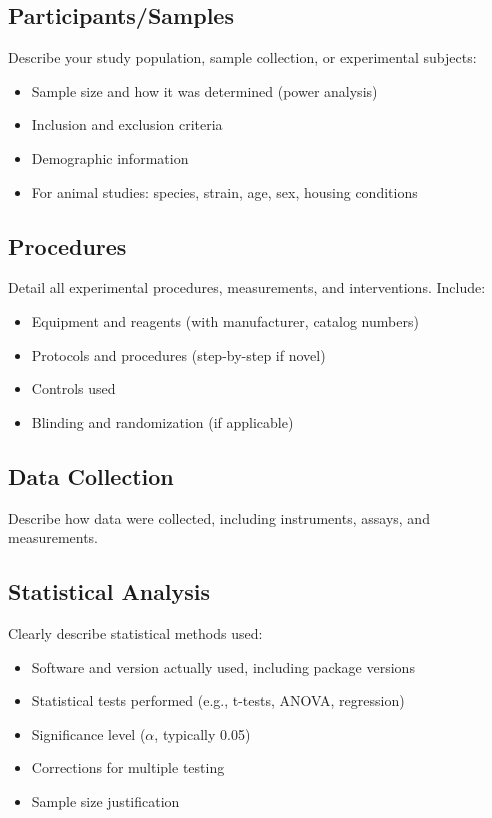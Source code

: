 \documentclass[10pt,letterpaper]{article}
\begin{document}
\subsection*{Participants/Samples}
Describe your study population, sample collection, or experimental subjects:
\begin{itemize}
    \item Sample size and how it was determined (power analysis)
    \item Inclusion and exclusion criteria
    \item Demographic information
    \item For animal studies: species, strain, age, sex, housing conditions
\end{itemize}

\subsection*{Procedures}
Detail all experimental procedures, measurements, and interventions. Include:
\begin{itemize}
    \item Equipment and reagents (with manufacturer, catalog numbers)
    \item Protocols and procedures (step-by-step if novel)
    \item Controls used
    \item Blinding and randomization (if applicable)
\end{itemize}

\subsection*{Data Collection}
Describe how data were collected, including instruments, assays, and measurements.

\subsection*{Statistical Analysis}
Clearly describe statistical methods used:
\begin{itemize}
    \item Software and version actually used, including package versions
    \item Statistical tests performed (e.g., t-tests, ANOVA, regression)
    \item Significance level ($\alpha$, typically 0.05)
    \item Corrections for multiple testing
    \item Sample size justification
\end{itemize}
\end{document}
